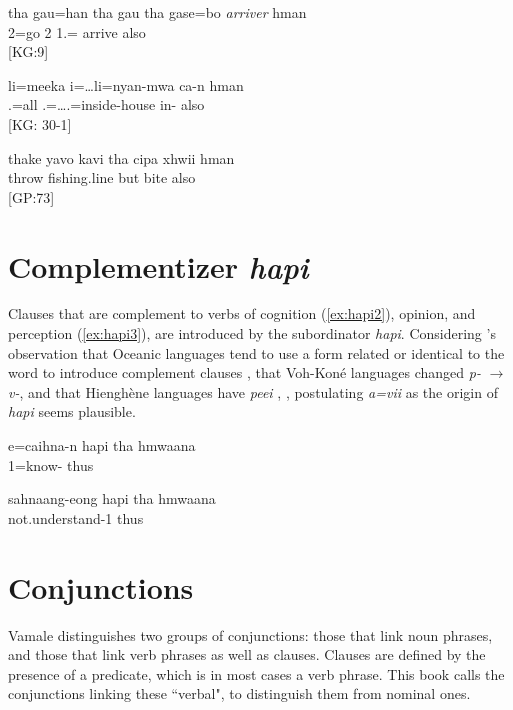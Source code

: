 \ea\label{ex:hmanV}
\gll tha gau=han tha gau tha gase=bo \textit{arriver} hman\\
  2=go  2  1.= arrive also\\
\glt {} {[KG:9]}
\z

\ea\label{ex:hman}
\gll li=meeka i=\ldots  li=nyan-mwa ca-n {hman}\\
 .=all .=\ldots {}.=inside-house in- also\\
\glt {} {[KG: 30-1]}
\z

\ea\label{ex:hmanDisc}
\gll thake yavo kavi tha cipa xhwii hman\\
 throw fishing.line but   bite also\\
\glt {} {[GP:73]}
\z

\section{Complementizer \textit{hapi}}
Clauses that are complement to verbs of cognition (\ref{ex:hapi2}), opinion, and perception (\ref{ex:hapi3}), are introduced by the subordinator \textit{hapi}. Considering \textcite{lynch_oceanic_2002}'s observation that Oceanic languages tend to use a form related or identical to the word  to introduce complement clauses \parencite[53]{lynch_oceanic_2002}, that Voh-Koné languages changed \textit{p-} $\rightarrow$ \textit{v-}, and that Hienghène languages have \textit{peei} ,  \parencite[260]{haudricourt_dictionnaire_1982}, postulating \textit{a=vii}  as the origin of \textit{hapi} seems plausible.


\ea\label{ex:hapi2}
\gll e=caihna-n hapi tha hmwaana\\
 1=know-   thus\\
\glt {}
\z


\ea\label{ex:hapi3}
\gll sahnaang-eong hapi tha hmwaana\\
 not.understand-1   thus\\
\glt {}
\z

\section{Conjunctions}
\label{sec:Conj}
Vamale distinguishes two groups of conjunctions: those that link noun phrases, and those that link verb phrases as well as clauses. Clauses are defined by the presence of a predicate, which is in most cases a verb phrase. This book calls the conjunctions linking these ``verbal", to distinguish them from nominal ones.   

